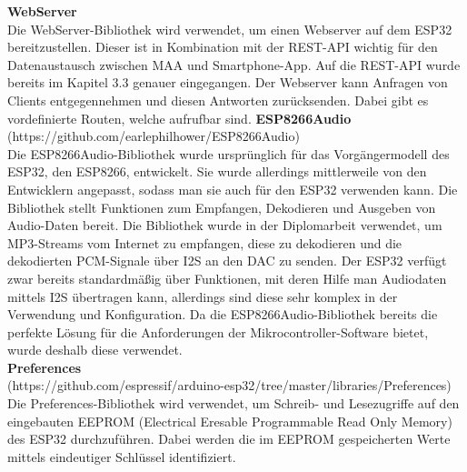 \documentclass[11pt, twoside]{article}
\begin{document}
\vspace{4mm}\newline
\textbf{WebServer} \\
Die \glqq WebServer\grqq{}-Bibliothek wird verwendet, um einen Webserver auf dem ESP32 bereitzustellen. Dieser ist in Kombination mit der REST-API wichtig für den Datenaustausch zwischen MAA und Smartphone-App. Auf die REST-API wurde bereits im Kapitel 3.3 genauer eingegangen. Der Webserver kann Anfragen von Clients entgegennehmen und diesen Antworten zurücksenden. Dabei gibt es vordefinierte Routen, welche aufrufbar sind.
\vspace{4mm}\newline
\textbf{ESP8266Audio} \\
(https://github.com/earlephilhower/ESP8266Audio) \\
Die \glqq ESP8266Audio\grqq{}-Bibliothek wurde ursprünglich für das Vorgängermodell des ESP32, den ESP8266, entwickelt. Sie wurde allerdings mittlerweile von den Entwicklern angepasst, sodass man sie auch für den ESP32 verwenden kann. Die Bibliothek stellt Funktionen zum Empfangen, Dekodieren und Ausgeben von Audio-Daten bereit. Die Bibliothek wurde in der Diplomarbeit verwendet, um MP3-Streams vom Internet zu empfangen, diese zu dekodieren und die dekodierten PCM-Signale über I2S an den DAC zu senden. Der ESP32 verfügt zwar bereits standardmäßig über Funktionen, mit deren Hilfe man Audiodaten mittels I2S übertragen kann, allerdings sind diese sehr komplex in der Verwendung und Konfiguration. Da die \glqq ESP8266Audio\grqq{}-Bibliothek bereits die perfekte Lösung für die Anforderungen der Mikrocontroller-Software bietet, wurde deshalb diese verwendet. \newline \\
\textbf{Preferences} \\
(https://github.com/espressif/arduino-esp32/tree/master/libraries/Preferences) \\
Die \glqq Preferences\grqq{}-Bibliothek wird verwendet, um Schreib- und Lesezugriffe auf den eingebauten EEPROM (Electrical Eresable Programmable Read Only Memory) des ESP32 durchzuführen. Dabei werden die im EEPROM gespeicherten Werte mittels eindeutiger Schlüssel identifiziert.
\end{document}
